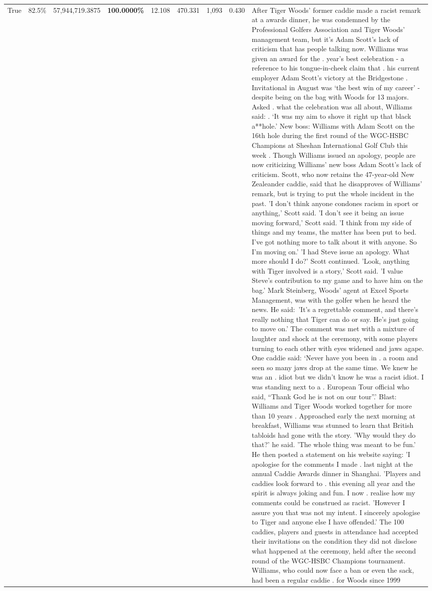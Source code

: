 \begin{table}[H]
\begin{tabular}{lllrlllll}
True & 82.5\% & 57,944,719.3875 & \bfseries \color{red} 100.0000\% & 12.108 & 470.331 & 1,093 & 0.430 & After Tiger Woods' former caddie made a racist remark at a awards dinner, he was condemned by the Professional Golfers Association and Tiger Woods' management team, but it's Adam Scott's lack of criticism that has people talking now. Williams was given an award for the . year’s best celebration - a reference to his tongue-in-cheek claim that . his current employer Adam Scott’s victory at the Bridgestone . Invitational in August was ‘the best win of my career’ - despite being on the bag with Woods for 13 majors. Asked . what the celebration was all about, Williams said: . ‘It was my aim to shove it right up that black a**hole.’ New boss: Williams with Adam Scott  on the 16th hole during the first round of the WGC-HSBC Champions at Sheshan International Golf Club this week . Though Williams issued an apology, people are now criticizing Williams' new boss Adam Scott's lack of criticism. Scott, who now retains the 47-year-old New Zealeander caddie, said that he disapproves of Williams' remark, but is trying to put the whole incident in the past. 'I don't think anyone condones racism in sport or anything,' Scott said. 'I don't see it being an issue moving forward,' Scott said. 'I think from my side of things and my teams, the matter has been put to bed. I've got nothing more to talk about it with anyone. So I'm moving on.' 'I had Steve issue an apology. What more should I do?' Scott continued. 'Look, anything with Tiger involved is a story,' Scott said. 'I value Steve's contribution to my game and to have him on the bag.' Mark Steinberg, Woods' agent at Excel Sports Management, was with the golfer when he heard the news. He said: 'It's a regrettable comment, and there's really nothing that Tiger can do or say. He's just going to move on.' The comment was met with a mixture of laughter and shock at the ceremony, with some players turning to each other with eyes widened and jaws agape. One caddie said: ‘Never have you been in . a room and seen so many jaws drop at the same time. We knew he was an . idiot but we didn’t know he was a racist idiot. I was standing next to a . European Tour official who said, “Thank God he is not on our tour”.’ Blast: Williams and Tiger Woods worked together for more than 10 years . Approached early the next morning at breakfast, Williams was stunned to learn that British tabloids had gone with the story. 'Why would they do that?' he said. 'The whole thing was meant to be fun.' He then posted a statement on his website saying: 'I apologise for the comments I made . last night at the annual Caddie Awards dinner in Shanghai. 'Players and caddies look forward to . this evening all year and the spirit is always joking and fun. I now . realise how my comments could be construed as racist. 'However I assure you that was not my intent. I sincerely apologise to Tiger and anyone else I have offended.' The 100 caddies, players and guests in attendance had accepted their invitations on the condition they did not disclose what happened at the ceremony, held after the second round of the WGC-HSBC Champions tournament. Williams, who could now face a ban or even the sack, had been a regular caddie . for Woods since 1999 
\end{tabular}
\end{table}
